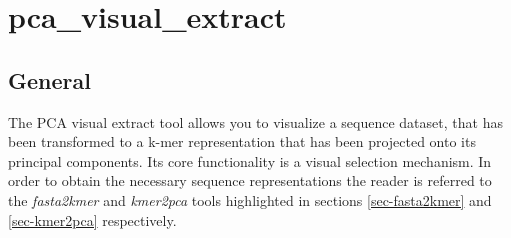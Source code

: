 \section{pca\_visual\_extract} \label{sec-pcavisual}

\subsection{General}

The PCA visual extract tool allows you to visualize a sequence dataset,
that has been transformed to a k-mer representation that has been
projected onto its principal components. Its core functionality is a
visual selection mechanism. In order to 
obtain the necessary sequence representations the reader is referred
to the \emph{fasta2kmer} and \emph{kmer2pca} tools highlighted in sections
\ref{sec-fasta2kmer} and \ref{sec-kmer2pca} respectively.

